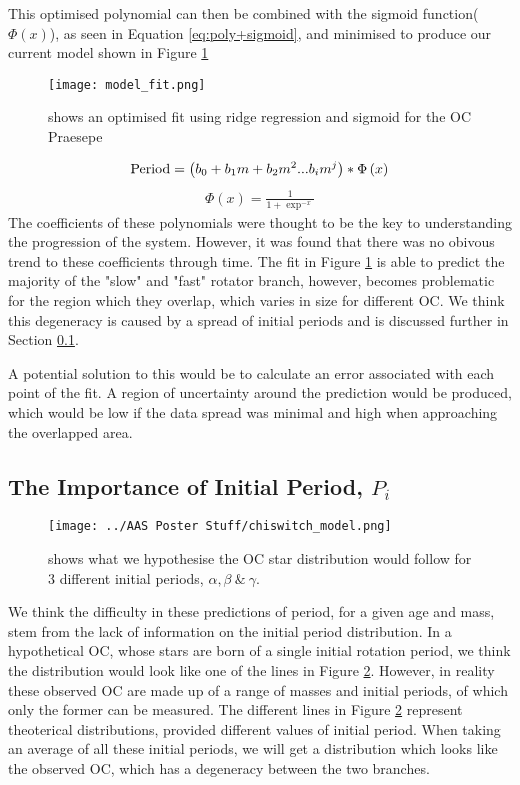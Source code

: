 \documentclass[fleqn,usenatbib]{mnras}
\begin{document}
{This optimised polynomial can then be combined with the sigmoid function($\Phi\left(x\right)$), as seen in Equation \ref{eq:poly+sigmoid}, and minimised to produce our current model shown in Figure \ref{fig:model_fit}
\begin{figure}
	\texttt{[image: model\_fit.png]}
	\caption{shows an optimised fit using ridge regression and sigmoid for the OC Praesepe}
	\label{fig:model_fit}
\end{figure}
\begin{align}
	\label{eq:poly+sigmoid}
	\textup{Period} = \left(b_0 + b_1m + b_2m^2...b_im^j\right)*\Phi\left(x\right) 
\end{align}
\begin{align}
	\label{eq:sigmoid}
	\Phi\left(x\right) = \frac{1}{1 + \exp^{-x}}
\end{align}
The coefficients of these polynomials were thought to be the key to understanding the progression of the system.
However, it was found that there was no obivous trend to these coefficients through time.
The fit in Figure \ref{fig:model_fit} is able to predict the majority of the "slow" and "fast" rotator branch, however, becomes problematic for the region which they overlap, which varies in size for different OC.
We think this degeneracy is caused by a spread of initial periods and is discussed further in Section \ref{sec:initial_period}.

A potential solution to this would be to calculate an error associated with each point of the fit.
A region of uncertainty around the prediction would be produced, which would be low if the data spread was minimal and high when approaching the overlapped area.

\subsection{The Importance of Initial Period, $P_i$} \label{sec:initial_period}
\begin{figure}
	\texttt{[image: ../AAS Poster Stuff/chiswitch\_model.png]}
	\caption{shows what we hypothesise the OC star distribution would follow for 3 different initial periods, $\alpha, \beta~\&~\gamma$.}
	\label{fig:spread_initial_period}
\end{figure}
We think the difficulty in these predictions of period, for a given age and mass, stem from the lack of information on the initial period distribution.
In a hypothetical OC, whose stars are born of a single initial rotation period, we think the distribution would look like one of the lines in Figure \ref{fig:spread_initial_period}.
However, in reality these observed OC are made up of a range of masses and initial periods, of which only the former can be measured.
The different lines in Figure \ref{fig:spread_initial_period} represent theoterical distributions, provided different values of initial period.
When taking an average of all these initial periods, we will get a distribution which looks like the observed OC, which has a degeneracy between the two branches.

}
\end{document}
